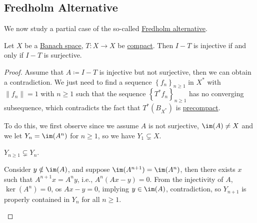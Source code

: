 \subsection{Fredholm Alternative}
We now study a partial case of the so-called \hyperref[def:Fredholm-alternative]{Fredholm alternative}.

\begin{theorem}\label{thm:Fredholm-alternative}
	Let \(X\) be a \hyperref[def:Banach-space]{Banach space}, \(T\colon X\to  X\) be \hyperref[def:compact-op]{compact}. Then \(I - T\) is injective if and only if \(I - T\) is surjective.
\end{theorem}
\begin{proof}
	Assume that \(A\coloneqq I - T\) is injective but not surjective, then we can obtain a contradiction. We just need to find a sequence \(\left\{ f_{n}  \right\}_{n\geq 1} \) in \(X^{\ast} \) with \(\lVert f_{n}  \rVert = 1\) with \(n\geq 1\) such that the sequence \(\left\{ T^{\ast} f_n \right\}_{n\geq 1} \) has no converging subsequence, which contradicts the fact that \(T^{\ast} (B_{X^{\ast} })\) is \hyperref[def:precompact]{precompact}.

	To do this, we first observe since we assume \(A\) is not surjective, \(\im(A) \neq X\) and we let \(Y_n = \im(A^n)\) for \(n\geq 1\), so we have \(Y_1 \subsetneq X\).
	\begin{claim}
		\(Y_{n\geq 1} \subsetneq Y_n\).
	\end{claim}
	\begin{explanation}
		Consider \(y \notin \im(A)\), and suppose \(\im(A^{n+1})= \im(A^n)\), then there exists \(x\) such that \(A^{n+1}x = A^n y\), i.e., \(A^n (Ax - y) = 0\). From the injectivity of \(A\), \(\ker(A^n) = 0\), os \(Ax - y = 0\), implying \(y\in \im(A)\), contradiction, so \(Y_{n+1}\) is properly contained in \(Y_n\) for all \(n\geq 1\).
	\end{explanation}


\end{proof}
